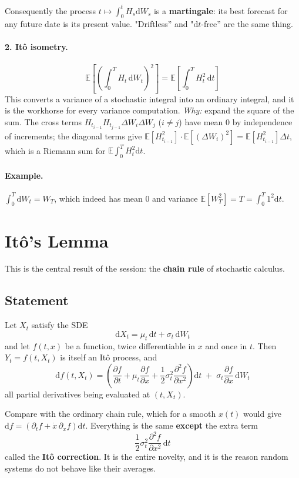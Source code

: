 \documentclass[]{article}
\newcommand{\E}{\mathbb{E}}
\newcommand{\Ito}{It\^{o}}
\newcommand{\dd}{\mathrm{d}}
\begin{document}
	Consequently the process $t \mapsto \int_0^t H_s \dd W_s$ is a \textbf{martingale}: its best forecast for any future date is its present value.
	"Driftless'' and "$\dd t$-free'' are the same thing.

	\paragraph{2. \Ito{} isometry.}
	$$
	\E\left[\left(\int_0^T H_t \, \dd W_t\right)^{\!2}\right] = \E\left[\int_0^T H_t^2 \, \dd t\right]
	$$
	This converts a variance of a stochastic integral into an ordinary integral, and it is the workhorse for every variance computation.
	\textit{Why:} expand the square of the sum. The cross terms $H_{t_{i-1}}H_{t_{j-1}}\Delta W_i \Delta W_j$ ($i \neq j$) have mean $0$ by independence of increments; the diagonal terms give $\E[H_{t_{i-1}}^2] \cdot \E[(\Delta W_i)^2] = \E[H_{t_{i-1}}^2] \Delta t$, which is a Riemann sum for $\E\int_0^T H_t^2 \dd t$.

	\paragraph{Example.}
	$\int_0^T \dd W_t = W_T$, which indeed has mean $0$ and variance $\E[W_T^2] = T = \int_0^T 1^2 \dd t$. \checkmark

	\section{\Ito's Lemma}

	This is the central result of the session: the \textbf{chain rule} of stochastic calculus.

	\subsection{Statement}

	Let $X_t$ satisfy the SDE
	$$
	\dd X_t = \mu_t \, \dd t + \sigma_t \, \dd W_t
	$$
	and let $f(t,x)$ be a function, twice differentiable in $x$ and once in $t$. Then $Y_t = f(t, X_t)$ is itself an \Ito{} process, and
	$$
	\boxed{\;
	\dd f(t,X_t) = \left(\frac{\partial f}{\partial t} + \mu_t \frac{\partial f}{\partial x} + \frac{1}{2}\sigma_t^2 \frac{\partial^2 f}{\partial x^2}\right) \dd t \; + \; \sigma_t \frac{\partial f}{\partial x} \, \dd W_t
	\;}
	$$
	all partial derivatives being evaluated at $(t, X_t)$.

	Compare with the ordinary chain rule, which for a smooth $x(t)$ would give $\dd f = \left(\partial_t f + \dot{x}\,\partial_x f\right)\dd t$.
	Everything is the same \textbf{except} the extra term
	$$
	\frac{1}{2}\sigma_t^2 \frac{\partial^2 f}{\partial x^2} \, \dd t
	$$
	called the \textbf{\Ito{} correction}. It is the entire novelty, and it is the reason random systems do not behave like their averages.
\end{document}
